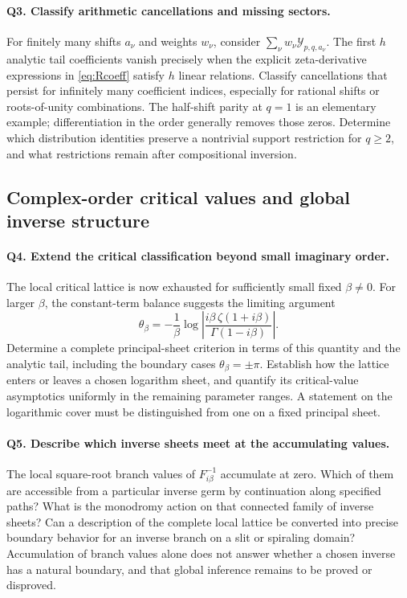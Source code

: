 \documentclass[11pt,a4paper]{article}
\numberwithin{equation}{section}
\theoremstyle{definition}
\theoremstyle{remark}
\newcommand{\cY}{\mathcal Y}
\begin{document}
\paragraph{Q3. Classify arithmetic cancellations and missing sectors.}
For finitely many shifts $a_\nu$ and weights $w_\nu$, consider
$\sum_\nu w_\nu\cY_{p,q,a_\nu}$. The first $h$ analytic tail
coefficients vanish precisely when the explicit zeta-derivative
expressions in \eqref{eq:Rcoeff} satisfy $h$ linear relations.
Classify cancellations that persist for infinitely many coefficient
indices, especially for rational shifts or roots-of-unity
combinations. The half-shift parity at $q=1$ is an elementary
example; differentiation in the order generally removes those
zeros. Determine which distribution identities preserve a
nontrivial support restriction for $q\ge2$, and what restrictions
remain after compositional inversion.

\subsection{Complex-order critical values and global inverse structure}

\paragraph{Q4. Extend the critical classification beyond small imaginary order.}
The local critical lattice is now exhausted for sufficiently small
fixed $\beta\ne0$. For larger $\beta$, the constant-term balance
suggests the limiting argument
\[
 \theta_\beta=-\frac1\beta
   \log\left|\frac{i\beta\,\zeta(1+i\beta)}
                     {\Gamma(1-i\beta)}\right|.
\]
Determine a complete principal-sheet criterion in terms of this
quantity and the analytic tail, including the boundary cases
$\theta_\beta=\pm\pi$. Establish how the lattice enters or leaves
a chosen logarithm sheet, and quantify its critical-value
asymptotics uniformly in the remaining parameter ranges.
A statement on the logarithmic cover must be distinguished from
one on a fixed principal sheet.

\paragraph{Q5. Describe which inverse sheets meet at the accumulating values.}
The local square-root branch values of $F_{i\beta}^{-1}$ accumulate
at zero. Which of them are accessible from a particular inverse
germ by continuation along specified paths? What is the monodromy
action on that connected family of inverse sheets? Can a
description of the complete local lattice be converted into
precise boundary behavior for an inverse branch on a slit or
spiraling domain? Accumulation of branch values alone does not
answer whether a chosen inverse has a natural boundary, and that
global inference remains to be proved or disproved.
\end{document}
